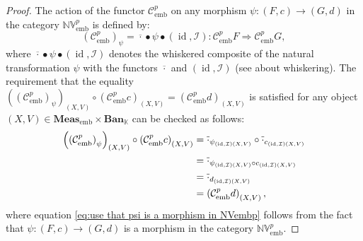 \documentclass{amsart}
\theoremstyle{definition}
\theoremstyle{plain}
\newcommand{\id}{\operatorname{id}}
\newcommand{\embMeas}{\mathbf{Meas}_\mathrm{emb}}
\newcommand{\NVembp}{\mathbb{NV}_{\mathrm{emb}}^p}
\newcommand{\Ban}{\mathbf{Ban}_{\mathbb{K}}}
\begin{document}
\begin{proof}
            The action of the functor $\mathcal{C}_{\mathrm{emb}}^p$ on any morphism $\psi \colon (F,c) \rightarrow (G,d)$ in the category $\NVembp$ is defined by:
            \begin{equation*}
                \left( \mathcal{C}_{\mathrm{emb}}^p \right)_{\psi} = \overline{\cdot} \bullet \psi \bullet (\id,\mathcal{I}) \colon \mathcal{C}_{\mathrm{emb}}^pF \Rightarrow \mathcal{C}_{\mathrm{emb}}^pG,
            \end{equation*}
            where $\overline{\cdot} \bullet \psi \bullet (\id,\mathcal{I})$ denotes the whiskered composite of the natural transformation $\psi$ with the functors $\overline{\cdot}$ and $(\id,\mathcal{I})$ (see \cite[\S 1.7]{Riehl2016} about whiskering).
            The requirement that the equality $\left( \left( \mathcal{C}_{\mathrm{emb}}^p \right)_{\psi} \right)_{(X,V)} \circ \left( \mathcal{C}_{\mathrm{emb}}^pc \right)_{(X,V)} = \left( \mathcal{C}_{\mathrm{emb}}^pd \right)_{(X,V)}$ is satisfied for any object $(X,V) \in \embMeas \times \Ban$ can be checked as follows:
            \begin{align}
                \left( \left( \mathcal{C}_{\mathrm{emb}}^p \right)_{\psi} \right)_{(X,V)} \circ \left( \mathcal{C}_{\mathrm{emb}}^pc \right)_{(X,V)} &= \overline{\cdot}_{\psi_{(\id,\mathcal{I})(X,V)}} \circ \overline{\cdot}_{c_{(\id,\mathcal{I})(X,V)}} \notag \\
                &= \overline{\cdot}_{\psi_{(\id,\mathcal{I})(X,V)} \circ c_{(\id,\mathcal{I})(X,V)}} \notag \\
                &= \overline{\cdot}_{d_{(\id,\mathcal{I})(X,V)}} \label{eq:use that psi is a morphism in NVembp} \\
                &= \left( \mathcal{C}_{\mathrm{emb}}^pd \right)_{(X,V)}, \notag
            \end{align}
            where equation \eqref{eq:use that psi is a morphism in NVembp} follows from the fact that $\psi \colon (F,c) \rightarrow (G,d)$ is a morphism in the category $\NVembp$.


\end{proof}
\end{document}
